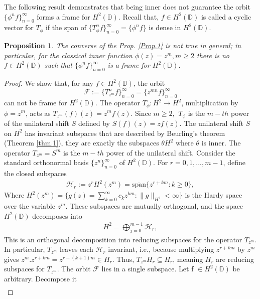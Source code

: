 \documentclass[12pt,titlepage]{amsart}
\newtheorem{prop}[thm]{Proposition}
\theoremstyle{definition}
\theoremstyle{remark}
\begin{document}
The following result demonstrates that being inner does not
guarantee the orbit $\{\phi^n f \}_{n=0}^\infty $ forms a frame
for $H^2(\mathbb{D})$. Recall that, $f \in H^2(\mathbb{D})$ is
called a cyclic vector for $T_\phi$ if the span of $\{T_\phi^n
f\}_{n=0}^\infty = \{\phi^n f\}$ is dense in $H^2(\mathbb{D})$.
\begin{prop} \label{Prop.2}
The converse of the Prop. \ref{Prop.1} is not true in general; in
particular, for the classical inner function $\phi(z)=z^m, m\geq2$
there is no $f\in H^2(\mathbb{D})$ such that $\{\phi^n f
\}_{n=0}^\infty $ is a frame for $H^2(\mathbb{D})$.
\end{prop}
\begin{proof}
We show that, for any $f\in H^2(\mathbb{D})$, the orbit
$$\mathcal{F}:=\{T_{z^m}^n f \}_{n=0}^\infty=\{z^{mn} f
\}_{n=0}^\infty $$ can not be frame for $H^2(\mathbb{D})$. The
operator $T_\phi : H^2 \to H^2$, multiplication by $\phi = z^m$,
acts as $T_{z^m}(f)(z) = z^m f(z)$. Since $m \geq 2,\,\ T_\phi$ is
the $m-th$ power of the unilateral shift $S$ defined by $S(f)(z) =
z f(z)$. The unilateral shift $S$ on $H^2$ has invariant subspaces
that are described by Beurling's theorem (Theorem \ref{thm.1}),
they are exactly the subspaces $\theta H^2$ where $\theta$ is
inner. The operator $T_{z^m} = S^m$ is the $m-th$ power of the
unilateral shift. Consider the standard orthonormal basis
$\{z^n\}_{n=0}^\infty$ of $H^2(\mathbb{D})$. For $r = 0, 1, ...,
m-1$, define the closed subspaces
\begin{eqnarray*}
\mathcal{H}_r := z^r H^2(z^m)=\overline{\text{span}}\{ z^{r + km}
: k \ge 0 \},
\end{eqnarray*}
Where $H^2(z^m) = \{ g(z) = \sum_{k=0}^\infty c_k z^{km} :
\|g\|_{H^2} < \infty \}$  is the Hardy space over the variable
$z^m$. These subspaces are mutually orthogonal, and the space
$H^2(\mathbb{D})$ decomposes into
\begin{eqnarray*}
H^2 = \bigoplus_{j=0}^{m-1} \mathcal{H}_r,
\end{eqnarray*}
This is an orthogonal decomposition into reducing subspaces for
the operator $T_{z^m}$. In particular, $T_{z^m}$ leaves each
$\mathcal{H}_r$ invariant, i.e., because multiplying $z^{r+km}$ by
$z^m$ gives $z^m.z^{r+km}=z^{r+(k+1)m} \in H_r$. Thus,
$T_{z^m}H_r\subseteq H_r$, meaning $H_r$ are reducing subspaces
for $T_{z^m}$. The orbit $\mathcal{F}$ lies in a single subspace.
Let f $\in H^2(\mathbb{D})$ be arbitrary. Decompose it
\begin{eqnarray*}

\end{eqnarray*}
\end{proof}
\end{document}
